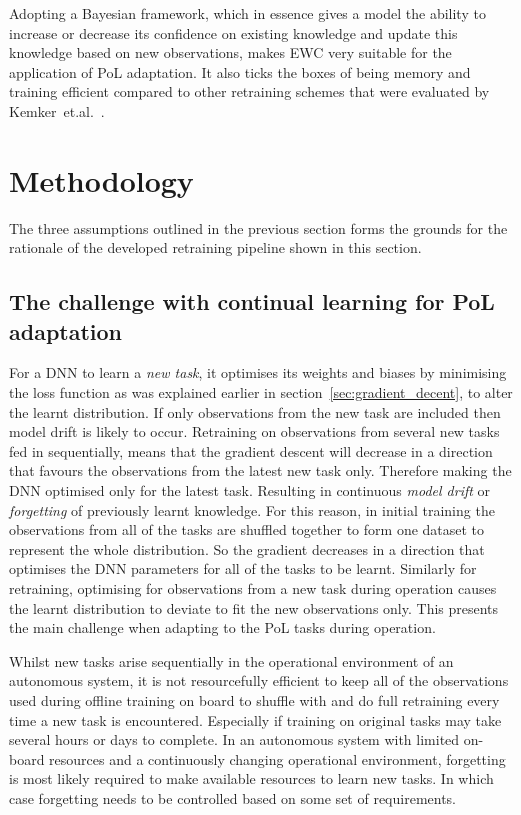 Adopting a Bayesian framework, which in essence gives a model the ability to increase or decrease its confidence on existing knowledge and update this knowledge based on new observations, makes EWC very suitable for the application of PoL adaptation.
%
It also ticks the boxes of being memory and training efficient compared to other retraining schemes that were evaluated by Kemker~et.al.~\cite{Kemker2018a}.


\section{Methodology}\label{sec:method}
The three assumptions outlined in the previous section forms the grounds for the rationale of the developed retraining pipeline shown in this section.
\subsection{The challenge with continual learning for PoL adaptation}
%
For a DNN to learn a \textit{new task}, it optimises its weights and biases by minimising the loss function as was explained earlier in section~\ref{sec:gradient_decent}, to alter the learnt distribution. If only observations from the new task are included then model drift is likely to occur. 
%
Retraining on observations from several new tasks fed in sequentially, means that the gradient descent will decrease in a direction that favours the observations from the latest new task only. Therefore making the DNN optimised only for the latest task. 
%
Resulting in continuous \textit{model drift} or \textit{forgetting} of previously learnt knowledge.
%
For this reason, in initial training the observations from all of the tasks are shuffled together to form one dataset to represent the whole distribution. 
%
So the gradient decreases in a direction that optimises the DNN parameters for all of the tasks to be learnt.
%
Similarly for retraining, optimising for observations from a new task during operation causes the learnt distribution to deviate to fit the new observations only. This presents the main challenge when adapting to the PoL tasks during operation. 

Whilst new tasks arise sequentially in the operational environment of
an autonomous system, it is not resourcefully efficient to keep all of the observations used during offline training on board to shuffle with and do full retraining every time a new task is encountered. Especially if training on original tasks may take several hours or days to complete.
%
In an autonomous system with limited on-board resources and a continuously changing operational environment, forgetting is most likely required to make available resources to learn new tasks.
%
In which case forgetting needs to be controlled based on some set of requirements.

